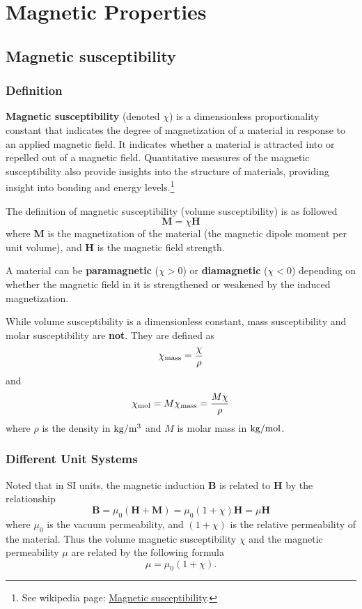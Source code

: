 \documentclass[11pt]{book} %
\begin{document}
\section{Magnetic Properties}
\subsection{Magnetic susceptibility}
\subsubsection{Definition}
\textbf{Magnetic susceptibility} (denoted $\chi$) is a dimensionless proportionality constant that indicates the degree of magnetization of a material in response to an applied magnetic field. It indicates whether a material is attracted into or repelled out of a magnetic field. Quantitative measures of the magnetic susceptibility also provide insights into the structure of materials, providing insight into bonding and energy levels.\footnote{See wikipedia page: \href{https://en.wikipedia.org/wiki/Magnetic_susceptibility}{Magnetic susceptibility}.}

The definition of magnetic susceptibility (volume susceptibility) is as followed
\begin{equation}
\mathbf{M} = \chi \mathbf{H}
\end{equation}
where $\mathbf{M}$ is the magnetization of the material (the magnetic dipole moment per unit volume), and $\mathbf{H}$ is the magnetic field strength.

A material can be \textbf{paramagnetic} ($\chi > 0$) or \textbf{diamagnetic} ($\chi < 0 $) depending on whether the magnetic field in it is strengthened or weakened by the induced magnetization.

While volume susceptibility is a dimensionless constant, mass susceptibility and molar susceptibility are \textbf{not}. They are defined as
\begin{equation}
\chi_{\rm mass} = \frac{\chi}{\rho}
\end{equation}
and
\begin{equation}
\chi_{\rm mol} = M \chi_{\rm mass} = \frac{M\chi}{\rho}
\end{equation}
where $\rho$ is the density in $\rm kg/m^3$ and $M$ is molar mass in $\rm kg/mol$.

\subsubsection{Different Unit Systems}
Noted that in SI units, the magnetic induction $\mathbf{B}$ is related to $\mathbf{H}$ by the relationship
\begin{equation}
\mathbf{B} = \mu_0 (\mathbf{H} + \mathbf{M}) = \mu_0(1+\chi)\mathbf{H} = \mu \mathbf{H}
\end{equation}
where $\mu_0$ is the vacuum permeability, and $(1+\chi)$ is the relative permeability of the material. Thus the volume magnetic susceptibility $\chi$ and the magnetic permeability $\mu$ are related by the following formula
\begin{equation}
\mu =\mu_{0}\left(1+\chi\right).
\end{equation}
\end{document}
